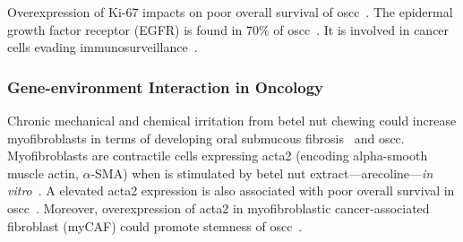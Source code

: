 \documentclass[12pt, a4paper]{article}
\begin{document}
Overexpression of Ki-67 impacts on poor overall survival of \acrshort{oscc}~\citep{Perisanidis2012,Szentkuti2015}.
The epidermal growth factor receptor (EGFR) is found in 70\% of \acrshort{oscc}~\citep{O-Charoenrat2000, Bentzen2005}.
It is involved in cancer cells evading immunosurveillance~\citep{Stefanidakis2006}.

\subsubsection{Gene-environment Interaction in Oncology}
Chronic mechanical and chemical irritation from betel nut chewing could increase myofibroblasts in terms of developing oral submucous fibrosis~\citep{Angadi2011} and \acrshort{oscc}.
Myofibroblasts are contractile cells expressing \acrfull{acta2} (encoding alpha-smooth muscle actin, $\alpha$-SMA) when is stimulated by betel nut extract---arecoline---\textit{\selectfont in vitro}~\citep{Chang2014}.
A elevated \acrshort{acta2} expression is also associated with poor overall survival in \acrshort{oscc}~\citep{Marsh2011}.
Moreover, overexpression of \acrshort{acta2} in myofibroblastic cancer-associated fibroblast (myCAF) could promote stemness of \acrshort{oscc}~\citep{Patel2018, Joshi2021}.
\end{document}

